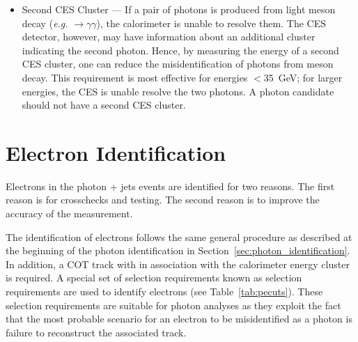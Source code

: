 \begin{singlespace}
\begin{itemize}
\item{Second CES Cluster --- If a pair of photons is produced from light meson decay (\textit{e.g.} \pizero$\to\gamma\gamma$), the calorimeter is unable to resolve them. The CES detector, however, may have information about an additional cluster indicating the second photon. Hence, by measuring the energy of a second CES cluster, one can reduce the misidentification of photons from meson decay. This requirement is most effective for energies $<$35~GeV; for larger energies, the CES is unable resolve the two photons. A photon candidate should not have a second CES cluster.
}

\end{itemize}
\end{singlespace}


\section{Electron Identification}
Electrons in the photon + jets events are identified for two reasons. The first reason is for crosschecks and testing. The second reason is to improve the accuracy of the \met measurement.

The identification of electrons follows the same general procedure as described at the beginning of the photon identification in Section~\ref{sec:photon_identification}. In addition, a COT track with  in association with the calorimeter energy cluster is required. A special set of selection requirements known as  selection requirements are used to identify electrons (see Table~\ref{tab:pecuts}). These selection requirements are suitable for photon analyses as they exploit the fact that the most probable scenario for an electron to be misidentified as a photon is failure to reconstruct the associated track.

